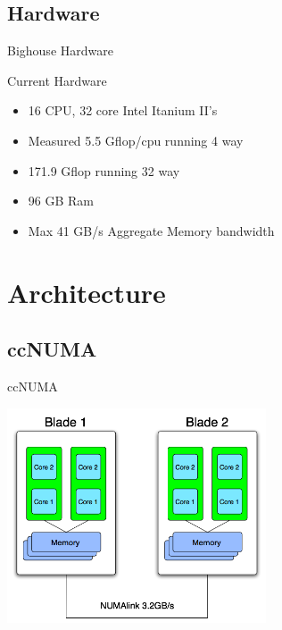 \documentclass[handout]{beamer}
\begin{document}
  \subsection {Hardware}
  \begin{frame}{Bighouse Hardware}
   \begin{block}{Current Hardware}
   \begin{itemize}
    \item<2->16 CPU, 32 core Intel Itanium II's
    \item<3->Measured 5.5 Gflop/cpu running 4 way
    \item<3->171.9 Gflop running 32 way
    \item<4->96 GB Ram
    \item<5->Max 41 GB/s Aggregate Memory bandwidth
   \end{itemize}
   \end{block}
  \end{frame}

  \section{Architecture}
  \subsection{ccNUMA}
  \begin{frame}{ccNUMA}
   \begin{center}\includegraphics[height=2.5in]{numa}\end{center}
  \end{frame}
\end{document}
